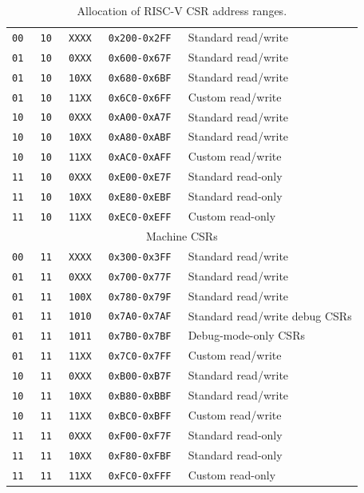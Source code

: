 \begin{table}[h!]
\begin{center}
\begin{tabular}{|c|c|c|c|l|}
\hline
\tt   00   &\tt   10  &\tt   XXXX   & \tt 0x200-0x2FF & Standard read/write \\
\tt   01   &\tt   10  &\tt   0XXX   & \tt 0x600-0x67F & Standard read/write \\
\tt   01   &\tt   10  &\tt   10XX   & \tt 0x680-0x6BF & Standard read/write \\
\tt   01   &\tt   10  &\tt   11XX   & \tt 0x6C0-0x6FF & Custom read/write \\
\tt   10   &\tt   10  &\tt   0XXX   & \tt 0xA00-0xA7F & Standard read/write \\
\tt   10   &\tt   10  &\tt   10XX   & \tt 0xA80-0xABF & Standard read/write \\
\tt   10   &\tt   10  &\tt   11XX   & \tt 0xAC0-0xAFF & Custom read/write \\
\tt   11   &\tt   10  &\tt   0XXX   & \tt 0xE00-0xE7F & Standard read-only \\
\tt   11   &\tt   10  &\tt   10XX   & \tt 0xE80-0xEBF & Standard read-only \\
\tt   11   &\tt   10  &\tt   11XX   & \tt 0xEC0-0xEFF & Custom read-only \\
\hline
\multicolumn{5}{|c|}{Machine CSRs}  \\
\hline
\tt   00   &\tt   11  &\tt   XXXX   & \tt 0x300-0x3FF & Standard read/write \\
\tt   01   &\tt   11  &\tt   0XXX   & \tt 0x700-0x77F & Standard read/write \\
\tt   01   &\tt   11  &\tt   100X   & \tt 0x780-0x79F & Standard read/write \\
\tt   01   &\tt   11  &\tt   1010   & \tt 0x7A0-0x7AF & Standard read/write debug CSRs  \\
\tt   01   &\tt   11  &\tt   1011   & \tt 0x7B0-0x7BF & Debug-mode-only CSRs \\
\tt   01   &\tt   11  &\tt   11XX   & \tt 0x7C0-0x7FF & Custom read/write \\
\tt   10   &\tt   11  &\tt   0XXX   & \tt 0xB00-0xB7F & Standard read/write \\
\tt   10   &\tt   11  &\tt   10XX   & \tt 0xB80-0xBBF & Standard read/write \\
\tt   10   &\tt   11  &\tt   11XX   & \tt 0xBC0-0xBFF & Custom read/write \\
\tt   11   &\tt   11  &\tt   0XXX   & \tt 0xF00-0xF7F & Standard read-only \\
\tt   11   &\tt   11  &\tt   10XX   & \tt 0xF80-0xFBF & Standard read-only \\
\tt   11   &\tt   11  &\tt   11XX   & \tt 0xFC0-0xFFF & Custom read-only \\
\hline
\end{tabular}
\end{center}
\caption{Allocation of RISC-V CSR address ranges.}
\label{csrrwpriv}
\end{table}

